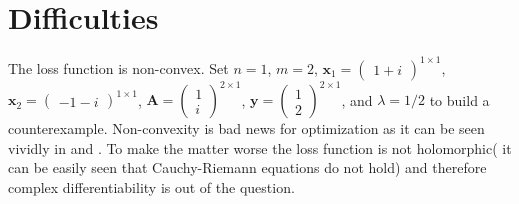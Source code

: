 \section{Difficulties}

The loss function is non-convex. Set $n=1$, $m=2$, $\boldsymbol{x}_1 = \begin{pmatrix}1+i\end{pmatrix}^{1 \times 1}$, 
$\boldsymbol{x}_2 = \begin{pmatrix}-1-i\end{pmatrix}^{1 \times 1}$, $\boldsymbol{A}=\begin{pmatrix}1\\i \end{pmatrix}^{2 \times 1}$, 
$\boldsymbol{y}=\begin{pmatrix}1\\2 \end{pmatrix}^{2 \times 1}$, and $\lambda=1/2$ to build a counterexample. Non-convexity is bad news for 
optimization as it can be seen vividly in \cite{bib:opt-boyd} and \cite{bib:opt-wright}. To make the matter worse the loss function is not 
holomorphic( it can be easily seen that Cauchy-Riemann equations\cite{bib:complex-ahl} do not hold) and therefore complex differentiability 
is out of the question\cite{bib:complex-ahl}.   



















